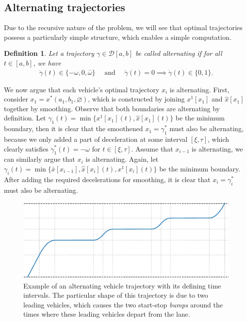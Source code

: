 \documentclass[a4paper]{article}
\theoremstyle{definition}
\theoremstyle{plain}
\newtheorem{define}{Definition\hspace{0.25em}\ignorespaces}
\begin{document}
\subsection{Alternating trajectories}

Due to the recursive nature of the problem, we will see that optimal
trajectories possess a particularly simple structure, which enables a simple
computation.

\begin{define}
  Let a trajectory $\gamma \in \mathcal{D}[a, b]$ be called \emph{alternating} if for all
  $t \in [a, b]$, we have
  \begin{align}
    \ddot{\gamma}(t) \in \{-\omega, 0, \bar{\omega}\} \quad \text{ and } \quad
    \ddot{\gamma}(t) = 0 \implies \dot{\gamma}(t) \in \{0, 1\}.
  \end{align}
\end{define}

We now argue that each vehicle's optimal trajectory $x_{i}$ is alternating.
First, consider $x_{1} = x^{*}(a_{1}, b_{1}, \varnothing)$, which is
constructed by joining $x^{1}[x_{1}]$ and $\hat{x}[x_{1}]$ together by smoothing. Observe that both boundaries are alternating by definition. Let
$\gamma_{1}(t) = \min\{x^{1}[x_{1}](t), \hat{x}[x_{1}](t) \}$ be the minimum boundary,
then it is clear that the smoothened $x_{1} = \gamma_{1}^{*}$ must also be
alternating, because we only added a part of deceleration at some interval
$[\xi, \tau]$, which clearly satisfies $\ddot{\gamma}_{1}^{*}(t) = -\omega$ for
$t \in [\xi,\tau]$.
%
Assume that $x_{i-1}$ is alternating, we can similarly argue that $x_{i}$ is
alternating. Again, let
$\gamma_{i}(t) = \min\{\bar{x}[x_{i-1}], \hat{x}[x_{i}](t), x^{1}[x_{i}](t)\}$ be the
minimum boundary. After adding the required decelerations for smoothing, it is
clear that $x_{i} = \gamma^{*}_{i}$ must also be alternating.

\begin{figure}
  \centering
  \includegraphics[scale=0.9]{figures/motion/tandem_trajectory}
  \caption{Example of an alternating vehicle trajectory with its defining time
    intervals. The particular shape of this trajectory is due to two leading
    vehicles, which causes the two start-stop \emph{bumps} around the times where these
    leading vehicles depart from the lane.}
  \label{fig:tandem_trajectory}
\end{figure}
\end{document}

